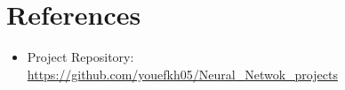 \documentclass[12pt,a4paper]{article}
\begin{document}
\renewcommand{\thesubsection}{\thesection.\arabic{subsection}}
\renewcommand{\thesubsubsection}{\thesubsection.\arabic{subsubsection}}

\section*{References}

\begin{itemize}
    \item Project Repository: \\
    \url{https://github.com/youefkh05/Neural_Netwok_projects}
\end{itemize}
\end{document}
